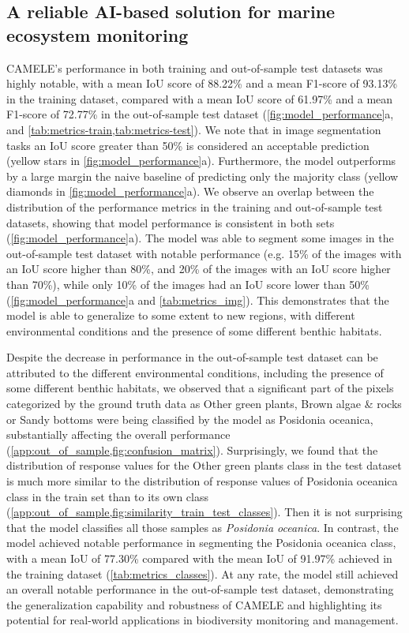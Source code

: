\subsection{A reliable AI-based solution for marine ecosystem monitoring}

CAMELE's performance in both training and out-of-sample test datasets was
highly notable, with a mean IoU score of 88.22\% and a mean F1-score of
93.13\% in the training dataset, compared with a mean IoU score of 61.97\%
and a mean F1-score of 72.77\% in the out-of-sample test dataset
(\cref{fig:model_performance}a, and \cref{tab:metrics-train,tab:metrics-test}).
We note that in image segmentation tasks an IoU score greater than 50\% is
considered an acceptable prediction \cite{dai2016instance} (yellow stars in
\cref{fig:model_performance}a).
Furthermore, the model outperforms by a large margin
the naive baseline of predicting only the majority class (yellow diamonds in
\cref{fig:model_performance}a). We observe an overlap between the
distribution of the performance metrics in the training and out-of-sample test
datasets, showing that model performance is consistent in both sets
(\cref{fig:model_performance}a). The model was able to segment some images in
the out-of-sample test dataset with notable performance (e.g. 15\% of the
images with an IoU score higher than 80\%, and 20\% of the images with an IoU
score higher than 70\%), while only 10\% of the images had an IoU score lower
than 50\% (\cref{fig:model_performance}a and \cref{tab:metrics_img}). This
demonstrates that the model is able to generalize to some extent to new
regions, with different environmental conditions and the presence of some
different benthic habitats.

Despite the decrease in performance in the out-of-sample test dataset can be
attributed to the different environmental conditions, including the presence of
some different benthic habitats, we observed that a significant part
of the pixels categorized by the ground truth data as Other green
plants, Brown algae \& rocks or Sandy bottoms were being classified by the
model as Posidonia oceanica, substantially affecting the overall
performance (\cref{app:out_of_sample,fig:confusion_matrix}).
Surprisingly, we found that the distribution of response values for the Other
green plants class in the test dataset is much more similar to the distribution
of response values of Posidonia oceanica class in the train set
than to its own class
(\cref{app:out_of_sample,fig:similarity_train_test_classes}). Then it is not
surprising that the
model classifies all those samples as \textit{Posidonia oceanica}. In contrast,
the model achieved notable performance in segmenting the Posidonia
oceanica class, with a mean IoU of 77.30\% compared with the mean IoU of
91.97\% achieved in the training dataset (\cref{tab:metrics_classes}). At
any
rate, the model still achieved an overall notable performance in the
out-of-sample test dataset, demonstrating the generalization capability and
robustness of CAMELE and highlighting its potential for real-world applications
in biodiversity monitoring and management.

